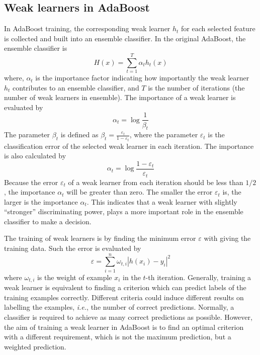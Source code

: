 \documentclass[a4paper,10pt]{article}
\begin{document}
\subsection{Weak learners in AdaBoost}
In AdaBoost training, the corresponding weak learner $h_{t}$ for each selected feature is collected and built into an ensemble classifier. In the original AdaBoost, the ensemble classifier is 
\begin{displaymath}
 H(x)  =  \sum_{t=1}^{T}\alpha_{t}h_{t}(x)
\end{displaymath}
where, $\alpha_{t}$ is the importance factor indicating how importantly the weak learner $h_{t}$ contributes to an ensemble classifier, and $T$ is the number of iterations (the number of weak learners in ensemble). The importance of a weak learner is evaluated by
\begin{equation}
 \alpha_{t} = \log \frac{1}{\beta_{t}}
\end{equation}
The parameter $\beta_{t}$ is defined as $\beta_{t}=\frac{\varepsilon_{t}}{1-\varepsilon_{t}}$, where the parameter $\varepsilon_{t}$ is the classification error of the selected weak learner in each iteration. The importance is also calculated by
\begin{displaymath}
 \alpha_{t} = \log \frac{1-\varepsilon_{t}}{\varepsilon_{t}}
\end{displaymath}
Because the error $\varepsilon_{t}$ of a weak learner from each iteration should be less than $1/2$, the importance $\alpha_{t}$ will be greater than zero. The smaller the error $\varepsilon_{t}$ is, the larger is the importance $\alpha_{t}$. This indicates that a weak learner with slightly ``stronger'' discriminating power, plays a more important role in the ensemble classifier to make a decision.

The training of weak learners is by finding the minimum error $\varepsilon$ with giving the training data. Such the error is evaluated by
\begin{equation}
 \varepsilon=\sum_{i=1}^{n}\omega_{t,i}|h(x_{i})-y_{i}|^{2}
\label{eq:errorwrtweights}
\end{equation}
where $\omega_{t,i}$ is the weight of example $x_i$ in the $t$-th iteration. Generally, training a weak learner is equivalent to finding a criterion which can predict labels of the training examples correctly. Different criteria could induce different results on labelling the examples, \textit{i.e.}, the number of correct predictions. Normally, a classifier is required to achieve as many correct predictions as possible. However, the aim of training a weak learner in AdaBoost is to find an optimal criterion with a different requirement, which is not the maximum prediction, but a weighted prediction.
\end{document}
